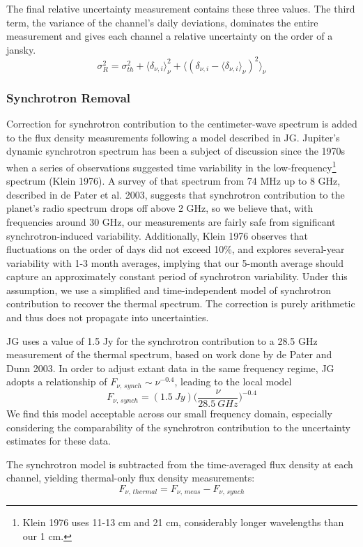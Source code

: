 \documentclass{article}
\begin{document}
	The final relative uncertainty measurement contains these three values.
	The third term, the variance of the channel's daily deviations, dominates the entire measurement and gives each channel a relative uncertainty on the order of a jansky.
	$$ \sigma_{R}^{2} = \sigma_{th}^{2} + \langle \delta_{\nu, i} \rangle_{\nu}^{2}
		 + \Big\langle (\delta_{\nu, i} - \langle \delta_{\nu, i} \rangle_{\nu})^{2} \Big\rangle_{\nu} $$


\subsubsection{Synchrotron Removal}
	Correction for synchrotron contribution to the centimeter-wave spectrum is added to the flux density measurements following a model described in JG.
	Jupiter's dynamic synchrotron spectrum has been a subject of discussion since the 1970s when a series of observations suggested time variability in the low-frequency\footnote{Klein 1976 uses 11-13 cm and 21 cm, considerably longer wavelengths than our 1 cm.} spectrum (Klein 1976).
	A survey of that spectrum from 74 MHz up to 8 GHz, described in de Pater et al. 2003, suggests that synchrotron contribution to the planet's radio spectrum drops off above 2 GHz, so we believe that, with frequencies around 30 GHz, our measurements are fairly safe from significant synchrotron-induced variability.
	Additionally, Klein 1976 observes that fluctuations on the order of days did not exceed 10\%, and explores several-year variability with 1-3 month averages, implying that our 5-month average should capture an approximately constant period of synchrotron variability.
	Under this assumption, we use a simplified and time-independent model of synchrotron contribution to recover the thermal spectrum.
	The correction is purely arithmetic and thus does not propagate into uncertainties.

	JG uses a value of 1.5 Jy for the synchrotron contribution to a 28.5 GHz measurement of the thermal spectrum, based on work done by de Pater and Dunn 2003.
	In order to adjust extant data in the same frequency regime, JG adopts a relationship of $F_{\nu,\,synch} \sim \nu^{-0.4}$, leading to the local model
	$$F_{\nu,\,synch} =  (1.5 \ Jy)\Bigg(\frac{\nu}{28.5 \ GHz}\Bigg)^{-0.4}$$
	We find this model acceptable across our small frequency domain, especially considering the comparability of the synchrotron contribution to the uncertainty estimates for these data.

	The synchrotron model is subtracted from the time-averaged flux density at each channel, yielding thermal-only flux density measurements:
	$$F_{\nu,\,thermal} = F_{\nu,\,meas} - F_{\nu,\,synch}$$
\end{document}
